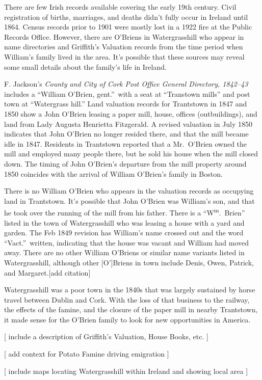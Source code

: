 There are few Irish records available covering the early 19th century. Civil registration of births, marriages, and deaths didn't fully occur in Ireland until 1864.\cite{Grenham1} Census records prior to 1901 were mostly lost in a 1922 fire at the Public Records Office.\cite{Grenham18} However, there are O'Briens in Watergrasshill who appear in name directories and Griffith's Valuation records from the time period when William's family lived in the area. It's possible that these sources may reveal some small details about the family's life in Ireland.

F. Jackson's \textit{County and City of Cork Post Office General Directory, 1842--43} includes a ``William O'Brien, gent.''\ with a seat at ``Transtown mills'' and post town at ``Watergrass hill.''\cite{Jacksons} Land valuation records for Trantstown in 1847 and 1850 show a John O'Brien leasing a paper mill, house, offices (outbuildings), and land from Lady Augusta Henrietta Fitzgerald.\cite{Peramb1847,Peramb1850} A revised valuation in July 1850 indicates that John O'Brien no longer resided there, and that the mill became idle in 1847.\cite{House1850} Residents in Trantstown reported that a Mr.\ O'Brien owned the mill and employed many people there, but he sold his house when the mill closed down.\cite{PaperMill} The timing of John O'Brien's departure from the mill property around 1850 coincides with the arrival of William O'Brien's family in Boston.

There is no William O'Brien who appears in the valuation records as occupying land in Trantstown. It's possible that John O'Brien was William's son, and that he took over the running of the mill from his father. There is a ``W\textsuperscript{m}.\ Brien'' listed in the town of Watergrasshill who was leasing a house with a yard and garden. The Feb 1849 revision has William's name crossed out and the word ``Vact.''\ written, indicating that the house was vacant and William had moved away.\cite{House1849} There are no other William O'Briens or similar name variants listed in Watergrasshill, although other [O']Briens in town include Denis, Owen, Patrick, and Margaret.[add citation]

Watergrasshill was a poor town in the 1840s that was largely sustained by horse travel between Dublin and Cork. With the loss of that business to the railway, the effects of the famine, and the closure of the paper mill in nearby Trantstown, it made sense for the O'Brien family to look for new opportunities in America.



[ include a description of Griffith's Valuation, House Books, etc. ]

[ add context for Potato Famine driving emigration ]

[ include maps locating Watergrasshill within Ireland and showing local area ]

